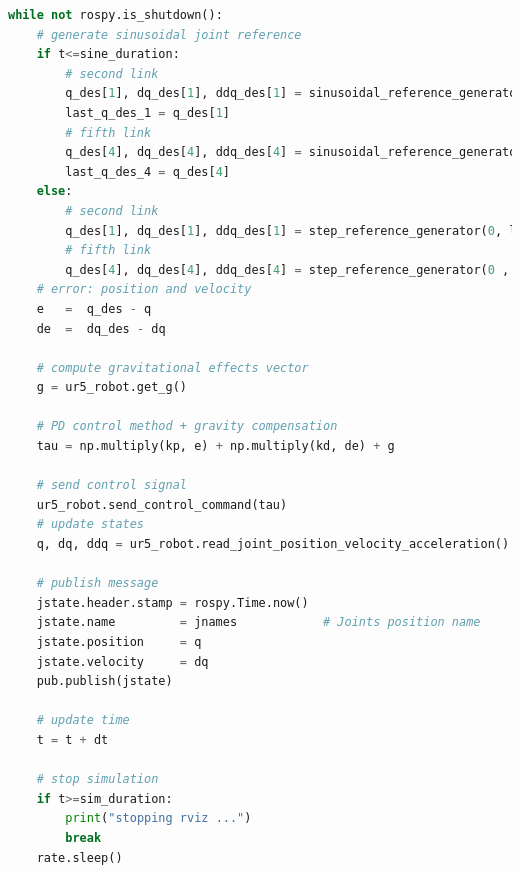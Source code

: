 \begin{lstlisting}[language=Python,caption={Move the second and fifth joint of UR5 robot with the requirement motion of activity 1.6.2}, label={lst:joint_PD_gravity_compensation_control_method_sinusoidal}]
while not rospy.is_shutdown():
    # generate sinusoidal joint reference
    if t<=sine_duration:
        # second link
        q_des[1], dq_des[1], ddq_des[1] = sinusoidal_reference_generator(q0[1], dq0[1], ddq0[1], 0.2, 1, t)
        last_q_des_1 = q_des[1]
        # fifth link
        q_des[4], dq_des[4], ddq_des[4] = sinusoidal_reference_generator(q0[4], dq0[4], ddq0[4], 0.4, 1.5, t)  
        last_q_des_4 = q_des[4]  
    else:   
        # second link
        q_des[1], dq_des[1], ddq_des[1] = step_reference_generator(0, last_q_des_1)
        # fifth link
        q_des[4], dq_des[4], ddq_des[4] = step_reference_generator(0 , last_q_des_4)
    # error: position and velocity
    e 	=  q_des - q
    de 	=  dq_des - dq    

    # compute gravitational effects vector
    g = ur5_robot.get_g()

    # PD control method + gravity compensation
    tau = np.multiply(kp, e) + np.multiply(kd, de) + g
    
    # send control signal
    ur5_robot.send_control_command(tau)
    # update states
    q, dq, ddq = ur5_robot.read_joint_position_velocity_acceleration()

    # publish message
    jstate.header.stamp = rospy.Time.now()
    jstate.name 		= jnames			# Joints position name
    jstate.position 	= q
    jstate.velocity 	= dq
    pub.publish(jstate)

    # update time
    t = t + dt
   
    # stop simulation
    if t>=sim_duration:
        print("stopping rviz ...")
        break
    rate.sleep()
\end{lstlisting}


